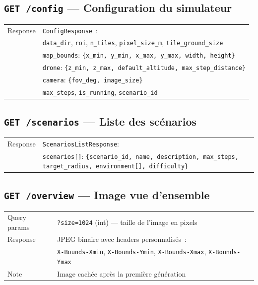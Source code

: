 \documentclass[a4paper, 11pt, french]{article}
\newcommand{\code}[1]{\texttt{#1}}
\newcommand{\apiendpoint}[2]{\texorpdfstring{\texttt{#1}~\texttt{#2}}{#1 #2}}
\begin{document}
\subsection{\apiendpoint{GET}{/config} --- Configuration du simulateur}

\begin{table}[H]
\centering\small
\begin{tabular}{lp{10cm}}
\toprule
Response & \code{ConfigResponse}~: \\
& \code{data\_dir}, \code{roi}, \code{n\_tiles}, \code{pixel\_size\_m},
  \code{tile\_ground\_size} \\
& \code{map\_bounds}: \code{\{x\_min, y\_min, x\_max, y\_max, width, height\}} \\
& \code{drone}: \code{\{z\_min, z\_max, default\_altitude, max\_step\_distance\}} \\
& \code{camera}: \code{\{fov\_deg, image\_size\}} \\
& \code{max\_steps}, \code{is\_running}, \code{scenario\_id} \\
\bottomrule
\end{tabular}
\end{table}

\subsection{\apiendpoint{GET}{/scenarios} --- Liste des scénarios}

\begin{table}[H]
\centering\small
\begin{tabular}{lp{10cm}}
\toprule
Response & \code{ScenariosListResponse}: \\
& \code{scenarios[]}: \code{\{scenario\_id, name, description, max\_steps,
  target\_radius, environment[], difficulty\}} \\
\bottomrule
\end{tabular}
\end{table}

\subsection{\apiendpoint{GET}{/overview} --- Image vue d'ensemble}

\begin{table}[H]
\centering\small
\begin{tabular}{lp{10cm}}
\toprule
Query params & \code{?size=1024} (int) --- taille de l'image en pixels \\
Response & JPEG binaire avec headers personnalisés~:\\
& \code{X-Bounds-Xmin}, \code{X-Bounds-Ymin}, \code{X-Bounds-Xmax},
  \code{X-Bounds-Ymax} \\
Note & Image cachée après la première génération \\
\bottomrule
\end{tabular}
\end{table}
\end{document}
